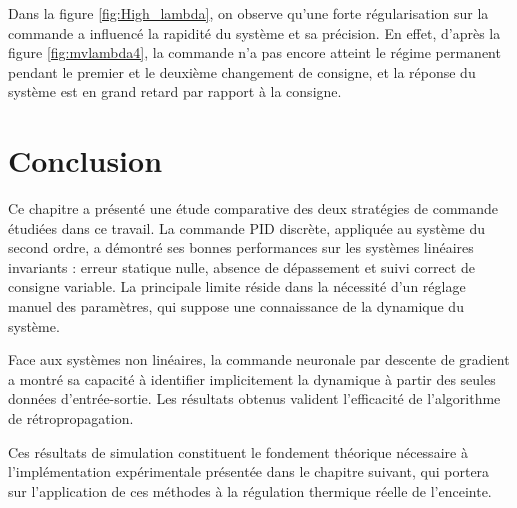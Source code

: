 Dans la figure \ref{fig:High_lambda}, on observe qu'une forte régularisation sur la commande a influencé la rapidité du système et sa précision. En effet, d'après la figure \ref{fig:mvlambda4}, la commande n'a pas encore atteint le régime permanent pendant le premier et le deuxième changement de consigne, et la réponse du système est en grand retard par rapport à la consigne.

\section*{Conclusion}

Ce chapitre a présenté une étude comparative des deux stratégies de commande étudiées dans ce travail. La commande PID discrète, appliquée au système du second ordre, a démontré ses bonnes performances sur les systèmes linéaires invariants : erreur statique nulle, absence de dépassement et suivi correct de consigne variable. La principale limite réside dans la nécessité d'un réglage manuel des paramètres, qui suppose une connaissance de la dynamique du système.

Face aux systèmes non linéaires, la commande neuronale par descente de gradient a montré sa capacité à identifier implicitement la dynamique à partir des seules données d'entrée-sortie. Les résultats obtenus valident l'efficacité de l'algorithme de rétropropagation.

Ces résultats de simulation constituent le fondement théorique nécessaire à l'implémentation expérimentale présentée dans le chapitre suivant, qui portera sur l'application de ces méthodes à la régulation thermique réelle de l'enceinte.